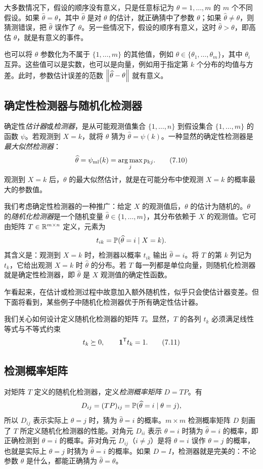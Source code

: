 大多数情况下，假设的顺序没有意义，只是任意标记为 $\theta=1,\ldots,m$ 的 $m$ 个不同假设。如果 $\widehat\theta=\theta$，其中 $\widehat\theta$ 是对 $\theta$ 的估计，就正确猜中了参数 $\theta$；如果 $\widehat\theta\ne\theta$，则猜测错误，把 $\widehat\theta$ 误作了 $\theta$。另一些情况下，假设的顺序有意义，这时 $\widehat\theta>\theta$，即高估 $\theta$，就是有意义的事件。

也可以将 $\theta$ 参数化为不属于 $\{1,\ldots,m\}$ 的其他值，例如 $\theta\in\{\theta_1,\ldots,\theta_m\}$，其中 $\theta_i$ 互异。这些值可以是实数，也可以是向量，例如用于指定第 $k$ 个分布的均值与方差。此时，参数估计误差的范数 $\left\lVert \widehat\theta-\theta\right\rVert$ 就有意义。

\subsection{确定性检测器与随机化检测器}
确定性\emph{估计器}或\emph{检测器}，是从可能观测值集合 $\{1,\ldots,n\}$ 到假设集合 $\{1,\ldots,m\}$ 的函数 $\psi$。若观测到 $X=k$，就将 $\theta$ 猜为 $\widehat\theta=\psi(k)$。一种显然的确定性检测器是\emph{最大似然检测器}：
\begin{equation}
 \widehat\theta=\psi_{\mathrm{ml}}(k)=\operatorname*{arg\,max}_jp_{kj}.\tag{7.10}
\end{equation}
观测到 $X=k$ 后，$\theta$ 的最大似然估计，就是在可能分布中使观测 $X=k$ 的概率最大的参数值。

我们考虑确定性检测器的一种推广：给定 $X$ 的观测值后，$\theta$ 的估计为随机的。$\theta$ 的\emph{随机化检测器}是一个随机变量 $\widehat\theta\in\{1,\ldots,m\}$，其分布依赖于 $X$ 的观测值。它可由矩阵 $T\in\mathbb R^{m\times n}$ 定义，元素为
\[
 t_{ik}=\mathbb P(\widehat\theta=i\mid X=k).
\]
其含义是：观测到 $X=k$ 时，检测器以概率 $t_{ik}$ 输出 $\widehat\theta=i$。将 $T$ 的第 $k$ 列记为 $t_k$，它给出观测 $X=k$ 时 $\widehat\theta$ 的分布。若 $T$ 每一列都是单位向量，则随机化检测器就是确定性检测器，即 $\widehat\theta$ 是 $X$ 观测值的确定性函数。

乍看起来，在估计或检测过程中故意加入额外随机性，似乎只会使估计器变差。但下面将看到，某些例子中随机化检测器优于所有确定性估计器。

我们关心如何设计定义随机化检测器的矩阵 $T$。显然，$T$ 的各列 $t_k$ 必须满足线性等式与不等式约束
\begin{equation}
 t_k\succeq0,\qquad\mathbf 1^{\mathsf T}t_k=1.\tag{7.11}
\end{equation}

\subsection{检测概率矩阵}
对矩阵 $T$ 定义的随机化检测器，定义\emph{检测概率矩阵} $D=TP$。有
\[
 D_{ij}=(TP)_{ij}=\mathbb P(\widehat\theta=i\mid\theta=j),
\]
所以 $D_{ij}$ 表示实际上 $\theta=j$ 时，猜为 $\widehat\theta=i$ 的概率。$m\times m$ 检测概率矩阵 $D$ 刻画了 $T$ 所定义随机化检测器的性能。对角元 $D_{ii}$ 表示 $\theta=i$ 时猜为 $\widehat\theta=i$ 的概率，即正确检测到 $\theta=i$ 的概率。非对角元 $D_{ij}$（$i\ne j$）是将 $\theta=i$ 误作 $\theta=j$ 的概率，也就是实际上 $\theta=j$ 时猜为 $\widehat\theta=i$ 的概率。如果 $D=I$，检测器就是完美的：不论参数 $\theta$ 是什么，都能正确猜为 $\widehat\theta=\theta$。

